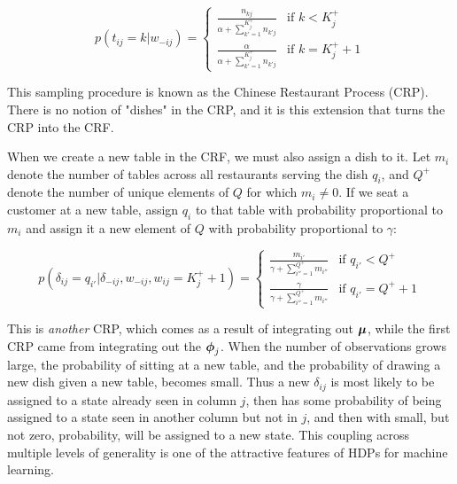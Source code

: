 \begin{equation}
 p(t_{ij} = k | w_{-ij}) = 
 \begin{cases} 
 \frac{n_{kj}}{\alpha + \sum_{k'=1}^{K^+_j}n_{k'j}} & \text{if } k < K^+_j \\
 \frac{\alpha}{\alpha + \sum_{k'=1}^{K^+_j}n_{k'j}} & \text{if } k = K^+_j + 1\label{crf:low}
 \end{cases}
\end{equation}

This sampling procedure is known as the Chinese Restaurant Process (CRP).  There is no notion of "dishes" in the CRP, and it is this extension that turns the CRP into the CRF.

When we create a new table in the CRF, we must also assign a dish to it.    Let $m_i$ denote the number of tables across all restaurants serving the dish $q_i$, and $Q^+$ denote the number of unique elements of $Q$ for which $m_i \ne 0$.  If we seat a customer at a new table, assign $q_i$ to that table with probability proportional to $m_i$ and assign it a new element of $Q$ with probability proportional to $\gamma$:

\begin{equation}
p(\delta_{ij} = q_{i'} | \delta_{-ij}, w_{-ij}, w_{ij} = K^+_j + 1) = 
\begin{cases}
\frac{m_{i'}}{\gamma + \sum_{i'' = 1}^{Q^+} m_{i''} } & \text{if } q_{i'} < Q^+ \\
\frac{\gamma}{\gamma + \sum_{i'' = 1}^{Q^+} m_{i''} } & \text{if } q_{i'} = Q^+ + 1\label{crf:high}
\end{cases}
\end{equation}

This is {\em another} CRP, which comes as a result of integrating out $\bmu$, while the first CRP came from integrating out the $\bphi_j$.  When the number of observations grows large, the probability of sitting at a new table, and the probability of drawing a new dish given a new table, becomes small.  Thus a new $\delta_{ij}$ is most likely to be assigned to a state already seen in column $j$, then has some probability of being assigned to a state seen in another column but not in $j$, and then with small, but not zero, probability, will be assigned to a new state.  This coupling across multiple levels of generality is one of the attractive features of HDPs for machine learning.

